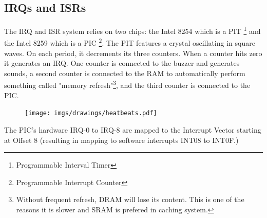 \subsection{IRQs and ISRs}
The IRQ and ISR system relies on two chips: the Intel 8254 which is a PIT \footnote{Programmable Interval Timer} and the Intel 8259 which is a PIC \footnote{Programmable Interrupt Counter}. The PIT features a crystal oscillating in square waves. On each period, it decrements its three counters. When a counter hits zero it generates an IRQ. One counter is connected to the buzzer and generates sounds, a second counter is connected to the RAM to automatically perform something called "memory refresh"\footnote{Without frequent refresh, DRAM will lose its content. This is one of the reasons it is slower and SRAM is prefered in caching system.}, and the third counter is connected to the PIC.\\
\par
\begin{figure}[H]
\centering
 \texttt{[image: imgs/drawings/heatbeats.pdf]}
 \end{figure}
\par

The PIC's hardware IRQ-0 to IRQ-8 are mapped to the Interrupt Vector starting at Offset 8 (resulting in mapping to software interrupts INT08 to INT0F.)\\

